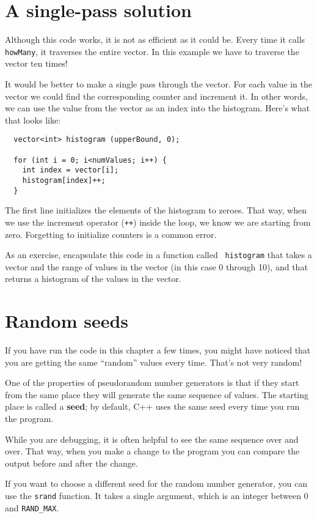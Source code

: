\section{A single-pass solution}

Although this code works, it is not as efficient as it could
be.  Every time it calls {\tt howMany}, it traverses the
entire vector.  In this example we have to traverse the
vector ten times!

It would be better to make a single pass through the vector.
For each value in the vector we could find the corresponding
counter and increment it.  In other words, we can use the
value from the vector as an index into the histogram.  Here's
what that looks like:

\begin{verbatim}
  vector<int> histogram (upperBound, 0);

  for (int i = 0; i<numValues; i++) {
    int index = vector[i];
    histogram[index]++;
  }
\end{verbatim}
%
The first line initializes the elements of the histogram to
zeroes.  That way, when we use the increment
operator ({\tt ++}) inside the loop, we know we are starting from zero.
Forgetting to initialize counters is a common error.

As an exercise, encapsulate this code in a function called {\tt
histogram} that takes a vector and the range of values in the vector
(in this case 0 through 10), and that returns a histogram of the
values in the vector.

\section{Random seeds}

If you have run the code in this chapter a few times, you might
have noticed that you are getting the same ``random'' values
every time.  That's not very random!

One of the properties of pseudorandom number generators is that
if they start from the same place they will generate
the same sequence of values.  The starting place is called
a {\bf seed}; by default, C++ uses
the same seed every time you run the program.

While you are debugging, it is often helpful to
see the same sequence over and over.  That way, when you make
a change to the program you can compare the output before and
after the change.

If you want to choose a different seed for the random number
generator, you can use the {\tt srand} function.  It takes
a single argument, which is an integer between 0 and {\tt RAND\_MAX}.

